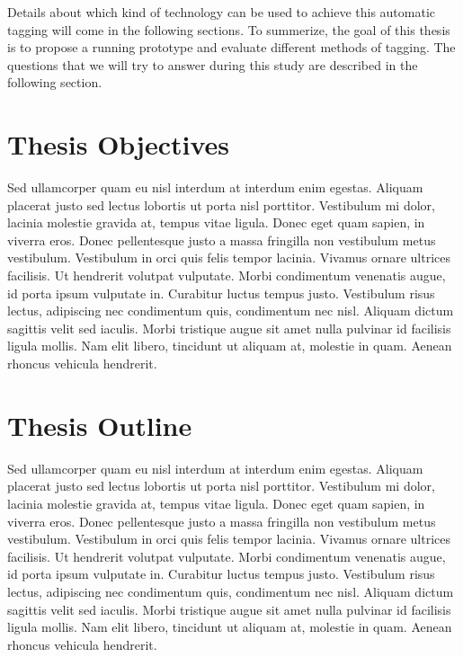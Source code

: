 Details about which kind of technology can be used to achieve this automatic tagging will come in the following sections. To summerize, the goal of this thesis is to propose a running prototype and evaluate different methods of tagging. The questions that we will try to answer during this study are described in the following section.

\section{Thesis Objectives}

Sed ullamcorper quam eu nisl interdum at interdum enim egestas. Aliquam placerat justo sed lectus lobortis ut porta nisl porttitor. Vestibulum mi dolor, lacinia molestie gravida at, tempus vitae ligula. Donec eget quam sapien, in viverra eros. Donec pellentesque justo a massa fringilla non vestibulum metus vestibulum. Vestibulum in orci quis felis tempor lacinia. Vivamus ornare ultrices facilisis. Ut hendrerit volutpat vulputate. Morbi condimentum venenatis augue, id porta ipsum vulputate in. Curabitur luctus tempus justo. Vestibulum risus lectus, adipiscing nec condimentum quis, condimentum nec nisl. Aliquam dictum sagittis velit sed iaculis. Morbi tristique augue sit amet nulla pulvinar id facilisis ligula mollis. Nam elit libero, tincidunt ut aliquam at, molestie in quam. Aenean rhoncus vehicula hendrerit.

\section{Thesis Outline}

Sed ullamcorper quam eu nisl interdum at interdum enim egestas. Aliquam placerat justo sed lectus lobortis ut porta nisl porttitor. Vestibulum mi dolor, lacinia molestie gravida at, tempus vitae ligula. Donec eget quam sapien, in viverra eros. Donec pellentesque justo a massa fringilla non vestibulum metus vestibulum. Vestibulum in orci quis felis tempor lacinia. Vivamus ornare ultrices facilisis. Ut hendrerit volutpat vulputate. Morbi condimentum venenatis augue, id porta ipsum vulputate in. Curabitur luctus tempus justo. Vestibulum risus lectus, adipiscing nec condimentum quis, condimentum nec nisl. Aliquam dictum sagittis velit sed iaculis. Morbi tristique augue sit amet nulla pulvinar id facilisis ligula mollis. Nam elit libero, tincidunt ut aliquam at, molestie in quam. Aenean rhoncus vehicula hendrerit.